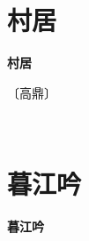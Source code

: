 \documentclass[12pt,UTF-8,openany,fontset=none]{ctexbook}
\begin{document}
\vspace{8pt}
\clearpage


\section{村居}



\begin{center}
    {\bfseries 村居}
\end{center}

\begin{center}
    \vspace{10pt}
    
    \begin{large}
        
        〔高鼎〕
        
    \end{large}
    
    \vspace{8pt}
    
    \begin{huge}
        
        \phantom{。}~~

        \phantom{。}
        
        \phantom{。}

        \phantom{。}
        
    \end{huge}
    
\end{center}

\vspace{8pt}
\clearpage


\section{暮江吟}



\begin{center}
    {\bfseries 暮江吟}
\end{center}
\end{document}
